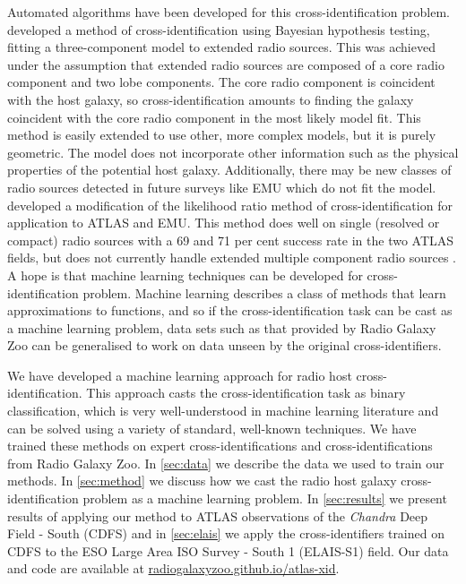 \documentclass[fleqn,usenatbib,usedcolumn]{mnras}
\begin{document}
  Automated algorithms have been developed for this cross-identification
  problem. \citet{fan15} developed a method of cross-identification using
  Bayesian hypothesis testing, fitting a three-component model to extended
  radio sources. This was achieved under the assumption that extended radio
  sources are composed of a core radio component and two lobe components. The
  core radio component is coincident with the host galaxy, so
  cross-identification amounts to finding the galaxy coincident with the core
  radio component in the most likely model fit. This method is easily extended
  to use other, more complex models, but it is purely geometric. The model
  does not incorporate other information such as the physical properties of
  the potential host galaxy. Additionally, there may be new classes of radio
  sources detected in future surveys like EMU which do not fit the model.
  \citet{weston17} developed a modification of the likelihood ratio method of
  cross-identification \citep{richter75likelihood} for application to ATLAS
  and EMU. This method does well on single (resolved or compact) radio sources
  with a 69 and 71 per cent success rate in the two ATLAS fields, but does not
  currently handle extended multiple component radio sources
  \citep{norris17unexpected}. A hope is that machine learning techniques can
  be developed for cross-identification problem. Machine learning describes a
  class of methods that learn approximations to functions, and so if the
  cross-identification task can be cast as a machine learning problem, data
  sets such as that provided by Radio Galaxy Zoo can be generalised to work on
  data unseen by the original cross-identifiers.

  We have developed a machine learning approach for radio host
  cross-identification. This approach casts the cross-identification task as
  binary classification, which is very well-understood in machine learning
  literature and can be solved using a variety of standard, well-known
  techniques. We have trained these methods on expert cross-identifications
  and cross-identifications from Radio Galaxy Zoo. In \autoref{sec:data} we
  describe the data we used to train our methods. In \autoref{sec:method} we
  discuss how we cast the radio host galaxy cross-identification problem as a
  machine learning problem. In \autoref{sec:results} we present results of
  applying our method to ATLAS observations of the \emph{Chandra} Deep Field -
  South (CDFS) and in \autoref{sec:elais} we apply the cross-identifiers
  trained on CDFS to the ESO Large Area ISO Survey - South 1 (ELAIS-S1) field.
  Our data and code are available at \url{radiogalaxyzoo.github.io/atlas-xid}.
\end{document}
